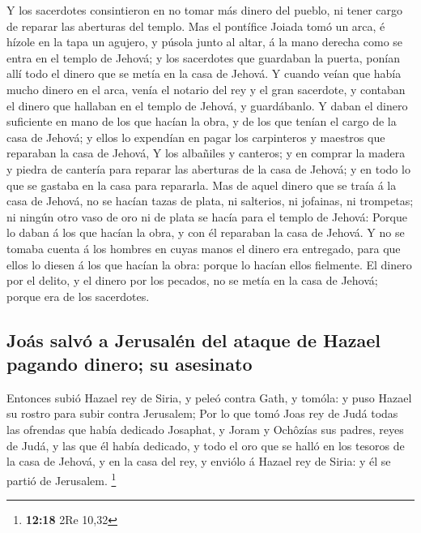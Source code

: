  Y los sacerdotes consintieron en no tomar más dinero del
pueblo, ni tener cargo de reparar las aberturas del templo.
 Mas el pontífice Joiada tomó un arca, é hízole en la tapa
un agujero, y púsola junto al altar, á la mano derecha como se entra en
el templo de Jehová; y los sacerdotes que guardaban la puerta, ponían
allí todo el dinero que se metía en la casa de Jehová.  Y
cuando veían que había mucho dinero en el arca, venía el notario del rey
y el gran sacerdote, y contaban el dinero que hallaban en el templo de
Jehová, y guardábanlo.  Y daban el dinero suficiente en
mano de los que hacían la obra, y de los que tenían el cargo de la casa
de Jehová; y ellos lo expendían en pagar los carpinteros y maestros que
reparaban la casa de Jehová,  Y los albañiles y canteros;
y en comprar la madera y piedra de cantería para reparar las aberturas
de la casa de Jehová; y en todo lo que se gastaba en la casa para
repararla.  Mas de aquel dinero que se traía á la casa de
Jehová, no se hacían tazas de plata, ni salterios, ni jofainas, ni
trompetas; ni ningún otro vaso de oro ni de plata se hacía para el
templo de Jehová:  Porque lo daban á los que hacían la
obra, y con él reparaban la casa de Jehová.  Y no se
tomaba cuenta á los hombres en cuyas manos el dinero era entregado, para
que ellos lo diesen á los que hacían la obra: porque lo hacían ellos
fielmente.  El dinero por el delito, y el dinero por los
pecados, no se metía en la casa de Jehová; porque era de los sacerdotes.

\hypertarget{jouxe1s-salvuxf3-a-jerusaluxe9n-del-ataque-de-hazael-pagando-dinero-su-asesinato}{%
\subsection{Joás salvó a Jerusalén del ataque de Hazael pagando dinero;
su
asesinato}\label{jouxe1s-salvuxf3-a-jerusaluxe9n-del-ataque-de-hazael-pagando-dinero-su-asesinato}}

 Entonces subió Hazael rey de Siria, y peleó contra Gath,
y tomóla: y puso Hazael su rostro para subir contra Jerusalem;
 Por lo que tomó Joas rey de Judá todas las ofrendas que
había dedicado Josaphat, y Joram y Ochôzías sus padres, reyes de Judá, y
las que él había dedicado, y todo el oro que se halló en los tesoros de
la casa de Jehová, y en la casa del rey, y enviólo á Hazael rey de
Siria: y él se partió de Jerusalem. \footnote{\textbf{12:18} 2Re 10,32}

